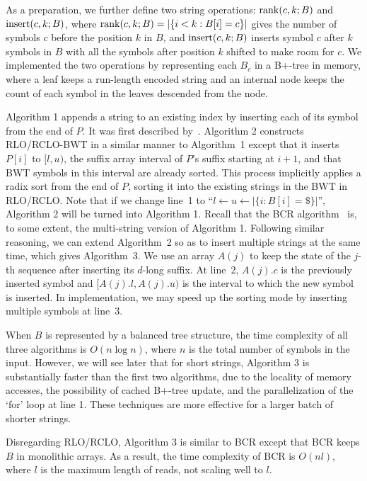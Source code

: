 \documentclass{bioinfo}
\begin{document}
\begin{methods}
As a preparation, we further define two string operations: ${\rm
rank}(c,k;B)$ and ${\rm insert}(c,k;B)$, where ${\rm
rank}(c,k;B)=|\{i<k:B[i]=c\}|$ gives the number of symbols $c$ before the
position $k$ in $B$, and ${\rm insert}(c,k;B)$ inserts symbol $c$ after $k$
symbols in $B$ with all the symbols after position $k$ shifted to make room for
$c$. We implemented the two operations by representing each $B_c$ in a
B+-tree in memory, where a leaf keeps a run-length encoded string and an internal node
keeps the count of each symbol in the leaves descended from the node.

Algorithm 1 appends a string to an existing index by inserting each of its
symbol from the end of $P$. It was first described
by~\citet{DBLP:conf/cpm/ChanHL04}. Algorithm 2 constructs RLO/RCLO-BWT
in a similar manner to Algorithm~1 except that it inserts $P[i]$ to
$[l,u)$, the suffix array interval of $P$'s suffix starting at $i+1$, and that
BWT symbols in this interval are already sorted. This process implicitly
applies a radix sort from the end of $P$, sorting it into the existing strings
in the BWT in RLO/RCLO.  Note that if we change line~1 to ``\mbox{$l\gets
u\gets|\{i:B[i]=\$\}|$}'', Algorithm 2 will be turned into Algorithm 1. Recall
that the BCR algorithm~\citep{DBLP:journals/tcs/BauerCR13} is, to some extent, the
multi-string version of Algorithm 1. Following similar reasoning, we can extend
Algorithm~2 so as to insert multiple strings at the same time, which gives
Algorithm~3. We use an array $A(j)$ to keep the state of the $j$-th sequence
after inserting its $d$-long suffix.  At line~2, $A(j).c$ is the previously
inserted symbol and $[A(j).l,A(j).u)$ is the interval to which the new symbol
is inserted. In implementation, we may speed up the sorting mode by inserting
multiple symbols at line~3.

When $B$ is represented by a balanced tree structure, the time complexity of
all three algorithms is $O(n\log n)$, where $n$ is the total number of symbols
in the input. However, we will see later that for short strings, Algorithm 3 is
substantially faster than the first two algorithms, due to the locality of
memory accesses, the possibility of cached B+-tree update, and the
parallelization of the `for' loop at line 1.  These techniques are more
effective for a larger batch of shorter strings.

Disregarding RLO/RCLO, Algorithm 3 is similar to BCR except that BCR
keeps $B$ in monolithic arrays. As a result, the time complexity of
BCR is $O(nl)$, where $l$ is the maximum length of reads, not scaling well to $l$.


\end{methods}
\end{document}
